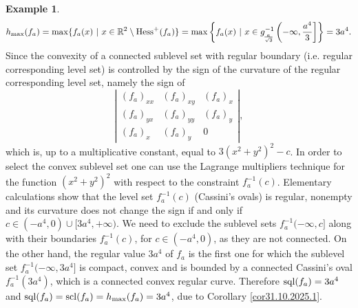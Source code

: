 \documentclass[12pt,twoside,reqno]{amsart}
\theoremstyle{definition}
\newtheorem{example}{Example}[section]
\numberwithin{equation}{section}
\begin{document}
\begin{example}
\[
h_{\max}(f_a)=\max\{f_a(x) \ | \ x\in\mathbb{R}^2\setminus {\rm Hess}^+(f_a)\}=\max\left\{f_a(x) \ | \ x\in g_{_{\!\frac{a}{\sqrt{3}}}}^{-1}\left(-\infty,\frac{a^4}{3}\right]\right\} =3a^4.
\]
Since the convexity of a connected sublevel set with regular boundary (i.e. regular corresponding level set) is controlled by the sign of the curvature 
of the regular corresponding level set, namely the sign of 
\begin{equation}
\left|
\begin{array}{lll}
(f_a)_{xx} & (f_a)_{xy} & (f_a)_x\\
(f_a)_{yx} & (f_a)_{yy} & (f_a)_y\\
(f_a)_x & (f_a)_y & 0
\end{array}
\right|,\label{curvature}
\end{equation}
which is, up to a multiplicative constant, equal to $3(x^2+y^2)^2-c$. In order to select the convex sublevel set one can use the Lagrange multipliers technique 
for the function $(x^2+y^2)^2$ with respect to the constraint $f_a^{-1}(c)$. Elementary calculations show that the  level set $f_a^{-1}(c)$ (Cassini's ovals) 
is regular, nonempty and its curvature does not change the sign if and only if $c\in(-a^4,0)\cup[3a^4,+\infty)$. We need to exclude the sublevel sets $f_a^{-1}(-\infty,c]$
along with their boundaries $f_a^{-1}(c)$, for $c\in(-a^4,0)$, as they are not connected.
On the other hand, the regular value $3a^4$ of $f_a$ is the first one for which the sublevel set $f_a^{-1}(-\infty,3a^4]$ is 
compact, convex and is bounded by a connected Cassini's oval $f_a^{-1}(3a^4)$, which is a connected convex regular curve. Therefore ${\rm sql}(f_a)=3a^4$ and 
${\rm sql}(f_a)={\rm scl}(f_a)=h_{\max}(f_a)=3a^4$, due to Corollary \ref{cor31.10.2025.1}.
\end{example}
\end{document}
